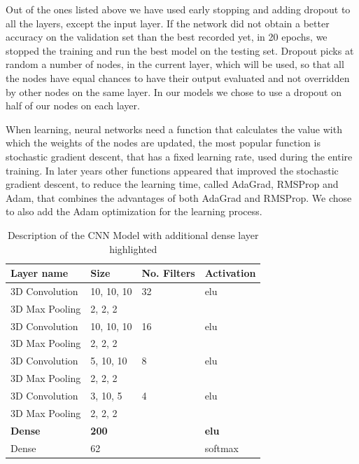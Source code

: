 \documentclass[12pt]{article}
\theoremstyle{definition}
\begin{document}
	Out of the ones listed above we have used early stopping and adding dropout to all the layers, except the input layer. If the network did not obtain a better accuracy on the validation set than the best recorded yet, in 20 epochs, we stopped the training and run the best model on the testing set. Dropout picks at random a number of nodes, in the current layer, which will be used, so that all the nodes have equal chances to have their output evaluated and not overridden by other nodes on the same layer. In our models we chose to use a dropout on half of our nodes on each layer.

	When learning, neural networks need a function that calculates the value with which the weights of the nodes are updated, the most popular function is stochastic gradient descent, that has a fixed learning rate, used during the entire training. In later years other functions appeared that improved the stochastic gradient descent, to reduce the learning time, called AdaGrad, RMSProp and Adam, that combines the advantages of both AdaGrad and RMSProp.
	We chose to also add the Adam optimization for the learning process.

	\begin{table}[h]
		\centering
		\renewcommand{\arraystretch}{1.5}

		\caption{Description of the CNN Model with additional dense layer highlighted}
		\label{table:dense-CNN}

		\begin{tabularx}{\textwidth}{XXXX}
			\textbf{Layer name} & \textbf{Size} & \textbf{No. Filters} & \textbf{Activation} \\ \hline
			3D Convolution    & 10, 10, 10   & 32                   & elu                  \\ \hline
			3D Max Pooling    & 2, 2, 2      & \textbf{\textendash} & \textbf{\textendash} \\ \hline
			3D Convolution    & 10, 10, 10   & 16                   & elu                  \\ \hline
			3D Max Pooling    & 2, 2, 2      & \textbf{\textendash} & \textbf{\textendash} \\ \hline
			3D Convolution    & 5, 10, 10    & 8                    & elu                  \\ \hline
			3D Max Pooling    & 2, 2, 2      & \textbf{\textendash} & \textbf{\textendash} \\ \hline
			3D Convolution    & 3, 10, 5     & 4                    & elu                  \\ \hline
			3D Max Pooling    & 2, 2, 2      & \textbf{\textendash} & \textbf{\textendash} \\ \hline
			\rowcolor{Gray}
			\textbf{Dense} & \textbf{200} & \textbf{\textendash} & \textbf{elu}         \\ \hline
			Dense          & 62           & \textbf{\textendash} & softmax              \\
		\end{tabularx}
	\end{table}
\end{document}
